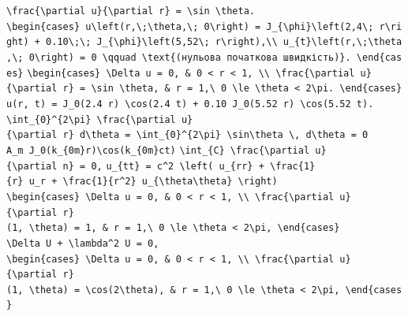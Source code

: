 \documentclass[
  ukrainian,
]{article}
\begin{document}
\texttt{\textbackslash{}frac\{\textbackslash{}partial\ u\}\{\textbackslash{}partial\ r\}\ =\ \textbackslash{}sin\ \textbackslash{}theta.}
\texttt{\textbackslash{}begin\{cases\}\ u\textbackslash{}left(r,\textbackslash{};\textbackslash{}theta,\textbackslash{};\ 0\textbackslash{}right)\ =\ J\_\{\textbackslash{}phi\}\textbackslash{}left(2,4\textbackslash{};\ r\textbackslash{}right)\ +\ 0.10\textbackslash{};\textbackslash{};\ J\_\{\textbackslash{}phi\}\textbackslash{}left(5,52\textbackslash{};\ r\textbackslash{}right),\textbackslash{}\textbackslash{}\ u\_\{t\}\textbackslash{}left(r,\textbackslash{};\textbackslash{}theta,\textbackslash{};\ 0\textbackslash{}right)\ =\ 0\ \textbackslash{}qquad\ \textbackslash{}text\{(нульова\ початкова\ швидкість)\}.\ \textbackslash{}end\{cases\}}
\texttt{\textbackslash{}begin\{cases\}\ \textbackslash{}Delta\ u\ =\ 0,\ \&\ 0\ \textless{}\ r\ \textless{}\ 1,\ \textbackslash{}\textbackslash{}\ \textbackslash{}frac\{\textbackslash{}partial\ u\}\{\textbackslash{}partial\ r\}\ =\ \textbackslash{}sin\ \textbackslash{}theta,\ \&\ r\ =\ 1,\textbackslash{}\ 0\ \textbackslash{}le\ \textbackslash{}theta\ \textless{}\ 2\textbackslash{}pi.\ \textbackslash{}end\{cases\}}
\texttt{u(r,\ t)\ =\ J\_0(2.4\ r)\ \textbackslash{}cos(2.4\ t)\ +\ 0.10\ J\_0(5.52\ r)\ \textbackslash{}cos(5.52\ t).}
\texttt{\textbackslash{}int\_\{0\}\^{}\{2\textbackslash{}pi\}\ \textbackslash{}frac\{\textbackslash{}partial\ u\}\{\textbackslash{}partial\ r\}\ d\textbackslash{}theta\ =\ \textbackslash{}int\_\{0\}\^{}\{2\textbackslash{}pi\}\ \textbackslash{}sin\textbackslash{}theta\ \textbackslash{},\ d\textbackslash{}theta\ =\ 0}
\texttt{A\_m\ J\_0(k\_\{0m\}r)\textbackslash{}cos(k\_\{0m\}ct)}
\texttt{\textbackslash{}int\_\{C\}\ \textbackslash{}frac\{\textbackslash{}partial\ u\}\{\textbackslash{}partial\ n\}\ =\ 0,}
\texttt{u\_\{tt\}\ =\ c\^{}2\ \textbackslash{}left(\ u\_\{rr\}\ +\ \textbackslash{}frac\{1\}\{r\}\ u\_r\ +\ \textbackslash{}frac\{1\}\{r\^{}2\}\ u\_\{\textbackslash{}theta\textbackslash{}theta\}\ \textbackslash{}right)}
\texttt{\textbackslash{}begin\{cases\}\ \textbackslash{}Delta\ u\ =\ 0,\ \&\ 0\ \textless{}\ r\ \textless{}\ 1,\ \textbackslash{}\textbackslash{}\ \textbackslash{}frac\{\textbackslash{}partial\ u\}\{\textbackslash{}partial\ r\}(1,\ \textbackslash{}theta)\ =\ 1,\ \&\ r\ =\ 1,\textbackslash{}\ 0\ \textbackslash{}le\ \textbackslash{}theta\ \textless{}\ 2\textbackslash{}pi,\ \textbackslash{}end\{cases\}}
\texttt{\textbackslash{}Delta\ U\ +\ \textbackslash{}lambda\^{}2\ U\ =\ 0,}
\texttt{\textbackslash{}begin\{cases\}\ \textbackslash{}Delta\ u\ =\ 0,\ \&\ 0\ \textless{}\ r\ \textless{}\ 1,\ \textbackslash{}\textbackslash{}\ \textbackslash{}frac\{\textbackslash{}partial\ u\}\{\textbackslash{}partial\ r\}(1,\ \textbackslash{}theta)\ =\ \textbackslash{}cos(2\textbackslash{}theta),\ \&\ r\ =\ 1,\textbackslash{}\ 0\ \textbackslash{}le\ \textbackslash{}theta\ \textless{}\ 2\textbackslash{}pi,\ \textbackslash{}end\{cases\}}
\end{document}
